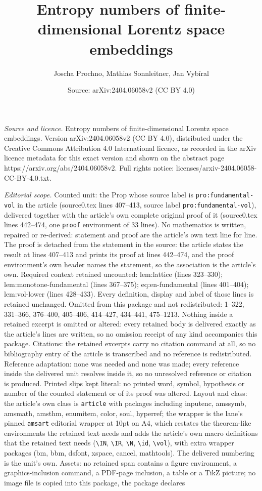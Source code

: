 \documentclass[10pt,a4paper]{amsart}
\title[Entropy numbers of finite-dimensional Lorentz space embeddin]{Entropy numbers of finite-dimensional Lorentz space embeddings}
\author{Joscha Prochno, Mathias Sonnleitner, Jan Vyb\'iral}
\date{Source: arXiv:2404.06058v2 (CC BY 4.0)}
\begin{document}
\maketitle

\noindent\emph{Source and licence.} Entropy numbers of finite-dimensional Lorentz space embeddings. Version arXiv:2404.06058v2 (CC BY 4.0), distributed under the Creative Commons Attribution 4.0 International licence, as recorded in the arXiv licence metadata for this exact version and shown on the abstract page https://arxiv.org/abs/2404.06058v2. Full rights notice: licenses/arxiv-2404.06058-CC-BY-4.0.txt.\par\smallskip

\noindent\textit{Editorial scope.} Counted unit: the Prop whose source label is \texttt{pro:fundamental-vol} in the article (source0.tex lines 407--413, source label \texttt{pro:fundamental-vol}), delivered together with the article's own complete original proof of it (source0.tex lines 442--474, one \texttt{proof} environment of 33 lines). No mathematics is written, repaired or re-derived: statement and proof are the article's own text line for line. The proof is detached from the statement in the source: the article states the result at lines 407--413 and prints its proof at lines 442--474, and the proof environment's own header names the statement, so the association is the article's own. Required context retained uncounted: lem:lattice (lines 323--330); lem:monotone-fundamental (lines 367--375); eq:en-fundamental (lines 401--404); lem:vol-lower (lines 428--433). Every definition, display and label of those lines is retained unchanged. Omitted from this package and not redistributed: 1--322, 331--366, 376--400, 405--406, 414--427, 434--441, 475--1213. Nothing inside a retained excerpt is omitted or altered: every retained body is delivered exactly as the article's lines are written, so no omission receipt of any kind accompanies this package. Citations: the retained excerpts carry no citation command at all, so no bibliography entry of the article is transcribed and no reference is redistributed. Reference adaptation: none was needed and none was made; every reference inside the delivered unit resolves inside it, so no unresolved reference or citation is produced. Printed slips kept literal: no printed word, symbol, hypothesis or number of the counted statement or of its proof was altered. Layout and class: the article's own class is \texttt{article} with packages including inputenc, amssymb, amsmath, amsthm, enumitem, color, soul, hyperref; the wrapper is the lane's pinned \texttt{amsart} editorial wrapper at 10pt on A4, which restates the theorem-like environments the retained text needs and adds the article's own macro definitions that the retained text needs (\texttt{\textbackslash IN}, \texttt{\textbackslash IR}, \texttt{\textbackslash N}, \texttt{\textbackslash id}, \texttt{\textbackslash vol}), with extra wrapper packages (bm, bbm, dsfont, xspace, cancel, mathtools). The delivered numbering is the unit's own. Assets: no retained span contains a figure environment, a graphics-inclusion command, a PDF-page inclusion, a table or a TikZ picture; no image file is copied into this package, the package declares 
\end{document}
